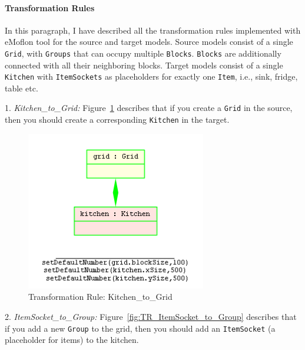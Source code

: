 

\paragraph{Transformation Rules} In this paragraph, I have described all the transformation rules implemented with eMoflon tool for the source and target models. Source models consist of a single \texttt{Grid}, with \texttt{Groups} that can occupy multiple \texttt{Blocks}. \texttt{Blocks} are additionally connected with all their neighboring blocks. Target models consist of a single \texttt{Kitchen} with \texttt{ItemSockets} as placeholders for exactly one \texttt{Item}, i.e., sink, fridge, table etc.

1. \textit{Kitchen\_to\_Grid: }  Figure~\ref{fig:TR_Kitchen_to_Grid} describes that if you create a \texttt{Grid} in the source, then you should create a corresponding \texttt{Kitchen} in the target.

\begin{figure}[h]
	\centering
	\includegraphics[width=0.7\textwidth]{figures/TR_Kitchen_to_Grid}
	\caption{Transformation Rule: Kitchen\_to\_Grid}
	\label{fig:TR_Kitchen_to_Grid}
\end{figure}

2. \textit{ItemSocket\_to\_Group: } Figure~\ref{fig:TR_ItemSocket_to_Group} describes that if you add a new \texttt{Group} to the grid, then you should add an \texttt{ItemSocket} (a placeholder for items) to the kitchen.

